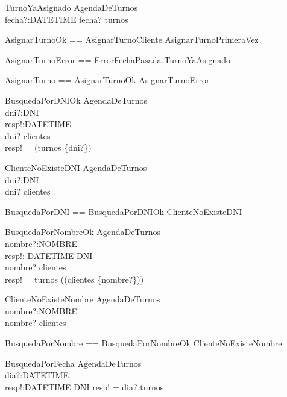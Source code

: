 \begin{schema}{TurnoYaAsignado}
\Xi AgendaDeTurnos \\
fecha?:DATETIME
\where
fecha? \in \dom turnos
\end{schema}

\begin{zed}
AsignarTurnoOk == AsignarTurnoCliente \lor AsignarTurnoPrimeraVez
\end{zed}

\begin{zed}
AsignarTurnoError == ErrorFechaPasada \lor TurnoYaAsignado
\end{zed}

\begin{zed}
AsignarTurno == AsignarTurnoOk \lor AsignarTurnoError
\end{zed}

\begin{schema}{BusquedaPorDNIOk}
\Xi AgendaDeTurnos \\
dni?:DNI \\
resp!:\power DATETIME \\
\where
dni? \in \dom clientes \\
resp! = \dom(turnos \rres \{dni?\})
\end{schema}

\begin{schema}{ClienteNoExisteDNI}
\Xi AgendaDeTurnos \\
dni?:DNI \\
\where
dni? \notin \dom clientes
\end{schema}

\begin{zed}
BusquedaPorDNI == BusquedaPorDNIOk \lor ClienteNoExisteDNI
\end{zed}

\begin{schema}{BusquedaPorNombreOk}
\Xi AgendaDeTurnos \\
nombre?:NOMBRE \\
resp!: DATETIME \pfun DNI \\
\where
nombre? \in \ran clientes \\
resp! = turnos \rres (\dom (clientes \rres \{nombre?\}))
\end{schema}

\begin{schema}{ClienteNoExisteNombre}
\Xi AgendaDeTurnos \\
nombre?:NOMBRE \\
\where
nombre? \notin \ran clientes
\end{schema}

\begin{zed}
BusquedaPorNombre == BusquedaPorNombreOk \lor ClienteNoExisteNombre
\end{zed}

\begin{schema}{BusquedaPorFecha}
\Xi AgendaDeTurnos \\
dia?:\power DATETIME \\
resp!:DATETIME \pfun DNI
\where
resp! = dia? \dres turnos
\end{schema}

